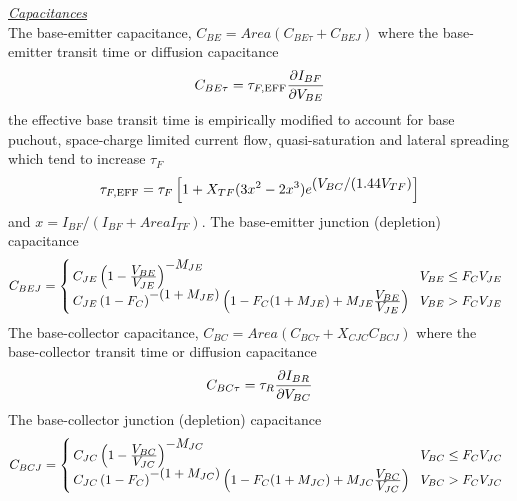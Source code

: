 \clearpage
\noindent\underline{\sl \large Capacitances}\\[0.1in]
\noindent The base-emitter capacitance,
$C_{BE} = Area( C_{BE\tau} + C_{BEJ})$\inlineeq
where the base-emitter transit time or diffusion capacitance
\begin{equation}
C_{BE\tau} = \tau_{F,\mbox{\scriptsize EFF}} {{\textstyle\partial I_{BF}} \over
       {\textstyle\partial V_{BE}}}
\end{equation}
the effective base transit time is empirically modified to account for base
puchout, space-charge limited current flow, quasi-saturation and lateral
spreading which tend to increase $\tau_F$
\begin{equation}
\tau_{F,\mbox{\scriptsize EFF}} =\tau_F\left[ 1+X_{TF}(3x^2-2x^3)
     e^{\textstyle (V_{BC}/(1.44V_{TF})}\right]
\end{equation}
and $x = {I_{BF}}/(I_{BF} + Area I_{TF})$.
The base-emitter junction (depletion) capacitance
\begin{equation}
C_{BEJ} = \left\{ \!\! \begin{array}{ll}
   C_{JE} \left(1-{{\textstyle V_{BE}}\over
   {\textstyle V_{JE}}}\right)^{\textstyle -M_{JE}}
   & \! V_{BE} \le F_C V_{JE}\\
   C_{JE} \left(1-F_C\right)^{\textstyle -(1+M_{JE})}
          \left(1-F_C(1+M_{JE})+M_{JE}{{\textstyle V_{BE}}\over
          {\textstyle V_{JE}}} \right)
   & \! V_{BE} > F_C V_{JE}
   \end{array} \right. %
\end{equation}
The base-collector capacitance,
$C_{BC} = Area(C_{BC\tau} +X_{CJC} C_{BCJ})$\inlineeq
where the base-collector transit time or diffusion capacitance
\begin{equation}
C_{BC\tau} = \tau_R {{\textstyle\partial I_{BR}} \over
       {\textstyle\partial V_{BC}}}
\end{equation}
The base-collector junction (depletion) capacitance
\begin{equation}
C_{BCJ} = \left\{ \! \! \begin{array}{ll}
   C_{JC} \left(1-{{\textstyle V_{BC}}\over
          {\textstyle V_{JC}}}\right)^{\textstyle -M_{JC}}
   & \! V_{BC} \le F_C V_{JC}\\
   C_{JC} \left(1-F_C\right)^{\textstyle -(1+M_{JC})}
          \left(1-F_C(1+M_{JC})+M_{JC}{{\textstyle V_{BC}}\over
          {\textstyle V_{JC}}} \right)
   & \! V_{BC} > F_C V_{JC}
   \end{array} \right. %
\end{equation}

